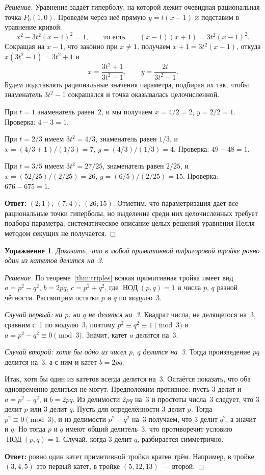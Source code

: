 \documentclass[a4paper,14pt]{extreport}
\theoremstyle{definition}
\newtheorem{exer}[thm]{Упражнение}
\newcommand{\answer}[1]{\par\medskip\noindent\textbf{Ответ:} #1}
\providecommand{\gcdru}{}\renewcommand{\gcdru}{\mathop{\text{НОД}}\nolimits}
\begin{document}
\begin{proof}[Решение]
\normalfont
Уравнение задаёт гиперболу, на которой лежит очевидная рациональная точка
$P_0(1,0)$. Проведём через неё прямую $y=t(x-1)$ и подставим в уравнение кривой:
\[
  x^2-3t^2(x-1)^2=1,\qquad\text{то есть}\qquad (x-1)(x+1)=3t^2(x-1)^2 .
\]
Сокращая на $x-1$, что законно при $x\neq1$, получаем $x+1=3t^2(x-1)$, откуда
$x(3t^2-1)=3t^2+1$ и
\[
  x=\frac{3t^2+1}{3t^2-1},\qquad y=\frac{2t}{3t^2-1}.
\]
Будем подставлять рациональные значения параметра, подбирая их так, чтобы
знаменатель $3t^2-1$ сокращался и точка оказывалась целочисленной.

При $t=1$ знаменатель равен~2, и мы получаем $x=4/2=2$, $y=2/2=1$. Проверка:
$4-3=1$.

При $t=2/3$ имеем $3t^2=4/3$, знаменатель равен $1/3$, и
$x=(4/3+1)/(1/3)=7$, $y=(4/3)/(1/3)=4$. Проверка: $49-48=1$.

При $t=3/5$ имеем $3t^2=27/25$, знаменатель равен $2/25$, и
$x=(52/25)/(2/25)=26$, $y=(6/5)/(2/25)=15$. Проверка: $676-675=1$.

\answer{$(2;1)$, $(7;4)$, $(26;15)$. Отметим, что параметризация даёт все
рациональные точки гиперболы, но выделение среди них целочисленных требует
подбора параметра; систематическое описание целых решений уравнения Пелля
методом секущих не получается.}
\end{proof}

\begin{exer}\label{ex:div3}
\itshape Доказать, что в любой примитивной пифагоровой тройке ровно один из
катетов делится на~3.
\end{exer}

\begin{proof}[Решение]
\normalfont
По теореме~\ref{thm:triples} всякая примитивная тройка имеет вид $a=p^2-q^2$,
$b=2pq$, $c=p^2+q^2$, где $\gcdru(p,q)=1$ и числа $p$, $q$ разной
чётности. Рассмотрим остатки $p$ и $q$ по модулю~3.

\emph{Случай первый: ни $p$, ни $q$ не делятся на~3.} Квадрат числа, не
делящегося на~3, сравним с~1 по модулю~3, поэтому $p^2\equiv q^2\equiv1\pmod 3$
и $a=p^2-q^2\equiv0\pmod 3$. Значит, катет $a$ делится на~3.

\emph{Случай второй: хотя бы одно из чисел $p$, $q$ делится на~3.} Тогда
произведение $pq$ делится на~3, а с ним и катет $b=2pq$.

Итак, хотя бы один из катетов всегда делится на~3. Остаётся показать, что оба
одновременно делиться не могут. Предположим противное: пусть 3 делит и
$a=p^2-q^2$, и $b=2pq$. Из делимости $2pq$ на~3 и простоты числа~3 следует, что
3 делит $p$ или 3 делит $q$. Пусть для определённости 3 делит $p$. Тогда
$p^2\equiv0\pmod 3$, и из делимости $p^2-q^2$ на~3 получаем, что 3 делит $q^2$,
а значит и $q$. Но тогда $p$ и $q$ имеют общий делитель~3, что противоречит
условию $\gcdru(p,q)=1$. Случай, когда 3 делит $q$, разбирается
симметрично.

\answer{ровно один катет примитивной тройки кратен трём. Например, в тройке
$(3,4,5)$ это первый катет, в тройке $(5,12,13)$~--- второй.}
\end{proof}
\end{document}
